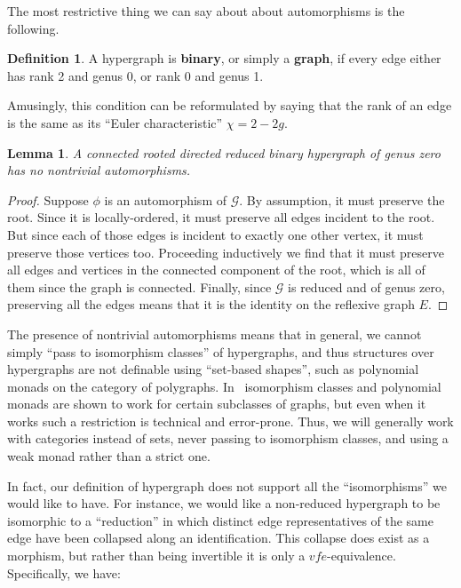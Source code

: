 \documentclass{article}
\newtheorem{lem}[thm]{Lemma}
\theoremstyle{definition}
\newtheorem{defn}[thm]{Definition}
\theoremstyle{remark}
\def\G{\mathcal{G}}
\def\genus{\mathsf{genus}}
\def\rank{\mathsf{rank}}
\begin{document}
The most restrictive thing we can say about about automorphisms is the following.

\begin{defn}
  A hypergraph is \textbf{binary}, or simply a \textbf{graph}, if %
  every edge either has rank 2 and genus 0, or rank 0 and genus 1.
\end{defn}

Amusingly, this condition can be reformulated by saying that the rank of an edge is the same as its ``Euler characteristic'' $\chi=2-2g$.

\begin{lem}
  A connected rooted directed reduced binary hypergraph of genus zero has no nontrivial automorphisms.
\end{lem}
\begin{proof}
  Suppose $\phi$ is an automorphism of $\G$.
  By assumption, it must preserve the root.
  Since it is locally-ordered, it must preserve all edges incident to the root.
  But since each of those edges is incident to exactly one other vertex, it must preserve those vertices too.
  Proceeding inductively we find that it must preserve all edges and vertices in the connected component of the root, which is all of them since the graph is connected.
  Finally, since $\G$ is reduced and of genus zero, preserving all the edges means that it is the identity on the reflexive graph $E$.
\end{proof}

The presence of nontrivial automorphisms means that in general, we cannot simply ``pass to isomorphism classes'' of hypergraphs, and thus structures over hypergraphs are not definable using ``set-based shapes'', such as polynomial monads on the category of polygraphs.
In~\cite{bb:htapm} isomorphism classes and polynomial monads are shown to work for certain subclasses of graphs, but even when it works such a restriction is technical and error-prone.
Thus, we will generally work with categories instead of sets, never passing to isomorphism classes, and using a weak monad rather than a strict one.

In fact, our definition of hypergraph does not support all the ``isomorphisms'' we would like to have.
For instance, we would like a non-reduced hypergraph to be isomorphic to a ``reduction'' in which distinct edge representatives of the same edge have been collapsed along an identification.
This collapse does exist as a morphism, but rather than being invertible it is only a $vfe$-equivalence.
Specifically, we have:
\end{document}
